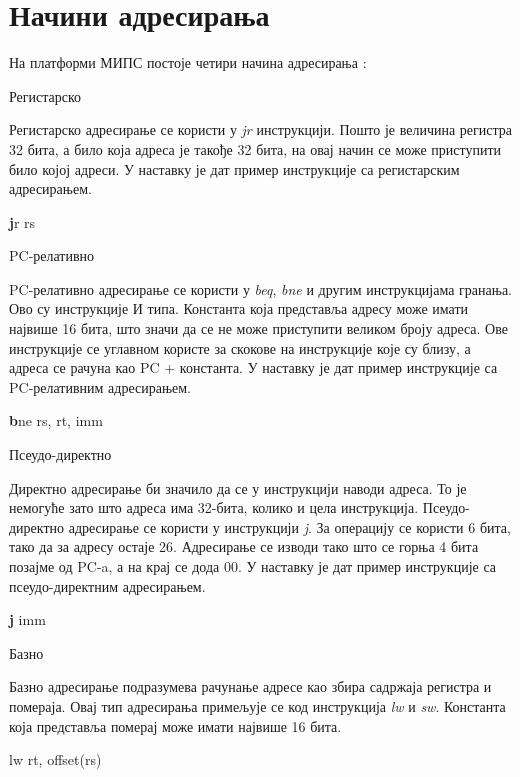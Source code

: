\documentclass[12pt,oneside]{memoir}
\begin{document}
\section{Начини адресирања}
\label{adresiranje}

На платформи МИПС постоје четири начина адресирања \cite{mips}:

\begin{description}
\item Регистарско

Регистарско адресирање се користи у \textit{jr} инструкцији. Пошто је величина регистра 32 бита, а било која адреса је такође 32 бита, на овај начин се може приступити било којој адреси. У наставку је дат пример инструкције са регистарским адресирањем.
\begin{listing}
\centering
\textbf jr rs
\end{listing}

\item PC-релативно

PC-релативно адресирање се користи у \textit{beq}, \textit{bne} и другим инструкцијама гранања. Ово су инструкције И типа. Константа која представља адресу може имати највише 16 бита, што значи да се не може приступити великом броју адреса. Ове инструкције се углавном користе за скокове на инструкције које су близу, а адреса се рачуна као PC + константа. У наставку је дат пример инструкције са PC-релативним адресирањем.
\begin{listing}
\centering
\textbf bne rs, rt, imm
\end{listing}

\item Псеудо-директно

Директно адресирање би значило да се у инструкцији наводи адреса. То је немогуће зато што адреса има 32-бита, колико и цела инструкција. Псеудо-директно адресирање се користи у инструкцији \textit{j}. За операцију се користи 6 бита, тако да за адресу остаје 26. Адресирање се изводи тако што се горња 4 бита позајме од PC-a, а на крај се дода 00. У наставку је дат пример инструкције са псеудо-директним адресирањем.

\begin{listing}
\centering
\textbf j imm
\end{listing}

\item Базно

Базно адресирање подразумева рачунање адресе као збира садржаја регистра и помераја. Овај тип адресирања примељује се код инструкција \textit{lw} и \textit{sw}. Константа која представља померај може имати највише 16 бита.

\begin{listing}
lw rt, offset(rs)
\centering
\end{listing}
\end{description}
\end{document}
